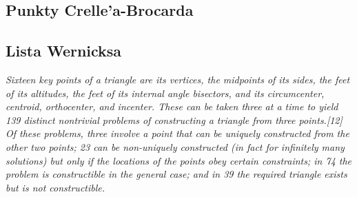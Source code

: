 \subsection{Punkty Crelle'a-Brocarda}

\subsection{Lista Wernicksa}
\emph{Sixteen key points of a triangle are its vertices, the midpoints of its sides, the feet of its altitudes, the feet of its internal angle bisectors, and its circumcenter, centroid, orthocenter, and incenter. These can be taken three at a time to yield 139 distinct nontrivial problems of constructing a triangle from three points.[12] Of these problems, three involve a point that can be uniquely constructed from the other two points; 23 can be non-uniquely constructed (in fact for infinitely many solutions) but only if the locations of the points obey certain constraints; in 74 the problem is constructible in the general case; and in 39 the required triangle exists but is not constructible.}

